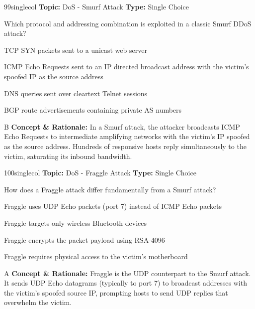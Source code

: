 \begin{qcard}{99}{singlecol}
\textcolor{darkslate!75}{\small\textbf{Topic:} DoS - Smurf Attack \hfill \textbf{Type:} Single Choice}\vspace{0.4em}\par
Which protocol and addressing combination is exploited in a classic Smurf DDoS attack?
\begin{qoptions}
\item TCP SYN packets sent to a unicast web server
\item ICMP Echo Requests sent to an IP directed broadcast address with the victim's spoofed IP as the source address
\item DNS queries sent over cleartext Telnet sessions
\item BGP route advertisements containing private AS numbers
\end{qoptions}
\end{qcard}
\nopagebreak
\begin{explainbox}{B}
\textbf{Concept \& Rationale:} In a Smurf attack, the attacker broadcasts ICMP Echo Requests to intermediate amplifying networks with the victim's IP spoofed as the source address. Hundreds of responsive hosts reply simultaneously to the victim, saturating its inbound bandwidth.
\end{explainbox}

\begin{qcard}{100}{singlecol}
\textcolor{darkslate!75}{\small\textbf{Topic:} DoS - Fraggle Attack \hfill \textbf{Type:} Single Choice}\vspace{0.4em}\par
How does a Fraggle attack differ fundamentally from a Smurf attack?
\begin{qoptions}
\item Fraggle uses UDP Echo packets (port 7) instead of ICMP Echo packets
\item Fraggle targets only wireless Bluetooth devices
\item Fraggle encrypts the packet payload using RSA-4096
\item Fraggle requires physical access to the victim's motherboard
\end{qoptions}
\end{qcard}
\nopagebreak
\begin{explainbox}{A}
\textbf{Concept \& Rationale:} Fraggle is the UDP counterpart to the Smurf attack. It sends UDP Echo datagrams (typically to port 7) to broadcast addresses with the victim's spoofed source IP, prompting hosts to send UDP replies that overwhelm the victim.
\end{explainbox}

